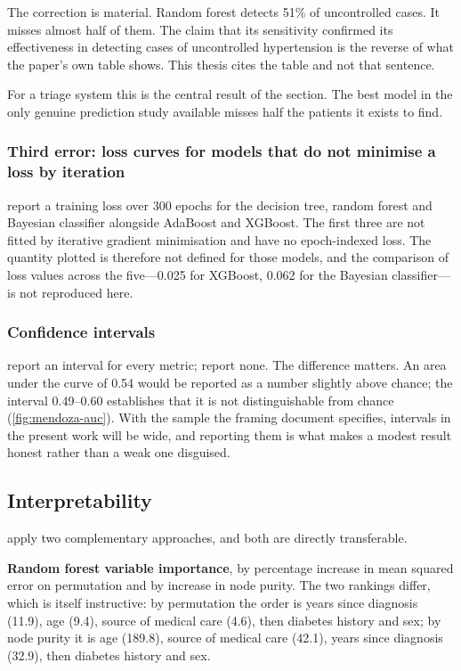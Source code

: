 \documentclass[12pt,a4paper,oneside]{report}
\begin{document}
The correction is material. Random forest detects 51\% of uncontrolled cases. It misses almost half of them. The claim that its sensitivity confirmed its effectiveness in detecting cases of uncontrolled hypertension is the reverse of what the paper's own table shows. This thesis cites the table and not that sentence.

For a triage system this is the central result of the section. The best model in the only genuine prediction study available misses half the patients it exists to find.

\subsubsection{Third error: loss curves for models that do not minimise a loss by iteration}

\Textcite{efendi2025} report a training loss over 300 epochs for the decision tree, random forest and Bayesian classifier alongside AdaBoost and XGBoost. The first three are not fitted by iterative gradient minimisation and have no epoch-indexed loss. The quantity plotted is therefore not defined for those models, and the comparison of loss values across the five---0.025 for XGBoost, 0.062 for the Bayesian classifier---is not reproduced here.

\subsubsection{Confidence intervals}

\Textcite{mendoza2025} report an interval for every metric; \textcite{efendi2025} report none. The difference matters. An area under the curve of 0.54 would be reported as a number slightly above chance; the interval 0.49--0.60 establishes that it is not distinguishable from chance (\cref{fig:mendoza-auc}). With the sample the framing document specifies, intervals in the present work will be wide, and reporting them is what makes a modest result honest rather than a weak one disguised.

\subsection{Interpretability}\label{sec:interpretability}

\Textcite{mendoza2025} apply two complementary approaches, and both are directly transferable.

\textbf{Random forest variable importance}, by percentage increase in mean squared error on permutation and by increase in node purity. The two rankings differ, which is itself instructive: by permutation the order is years since diagnosis (11.9), age (9.4), source of medical care (4.6), then diabetes history and sex; by node purity it is age (189.8), source of medical care (42.1), years since diagnosis (32.9), then diabetes history and sex.
\end{document}
